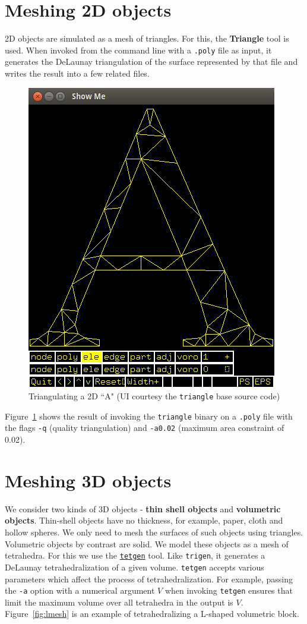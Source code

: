 \documentclass[12pt]{report}
\begin{document}
\section{Meshing 2D objects}

2D objects are simulated as a mesh of triangles. For this, the \textbf{Triangle} tool \cite{shewchuk} is used. When invoked from the command line with a \texttt{.poly} file as input, it generates the DeLaunay triangulation of the surface represented by that file and writes the result into a few related files.

\begin{figure}[H]
\centering
\includegraphics[width=.5\linewidth]{img/triangle}
\caption{Triangulating a 2D ``A" (UI courtesy the \texttt{triangle} base source code)}
\label{fig:atriangle}
\end{figure}

Figure~\ref{fig:atriangle} shows the result of invoking the \texttt{triangle} binary on a \texttt{.poly} file with the flags \texttt{-q} (quality triangulation) and \texttt{-a0.02} (maximum area constraint of 0.02).

\section{Meshing 3D objects}

We consider two kinds of 3D objects - \textbf{thin shell objects} and \textbf{volumetric objects}. Thin-shell objects have no thickness, for example, paper, cloth and hollow spheres. We only need to mesh the surfaces of such objects using triangles. Volumetric objects by contrast are solid. We model these objects as a mesh of tetrahedra. For this we use the \href{http://www.tetgen.org/}{\texttt{tetgen}} tool. Like \texttt{trigen}, it generates a DeLaunay tetrahedralization of a given volume. \texttt{tetgen} accepts various parameters which affect the process of tetrahedralization. For example, passing the \texttt{-a} option with a numerical argument $V$ when invoking \texttt{tetgen} ensures that limit the maximum volume over all tetrahedra in the output is $V$. Figure~\ref{fig:lmesh} is an example of tetrahedralizing a L-shaped volumetric block.
\end{document}
